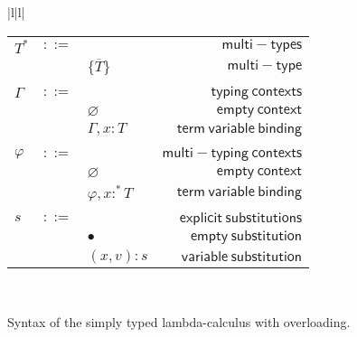 \documentclass[preprint,authoryear,sort&compress,9pt,nocopyrightspace]{article}
\newcommand{\mtP}[1]{#1^{*}}
\newcommand{\mtC}[1]{\{\overline {#1}\}}
\newcommand{\emt}{\varphi}
\newcommand{\conc}{:^{*}}
\begin{document}
\begin{figure}
\begin{small}
\begin{center}
\begin{tabular}{|l|l|}
\begin{tabular}{l c l r}
$\mtP{T}$&$::=$&&$\mathsf {multi-types}$\\
&&$\mtC{T}$&$\mathsf {multi-type}$\\
&&&\\
$\Gamma$&$::=$&&$\mathsf {typing \ contexts}$\\
&&$\varnothing$&$\mathsf {empty \ context}$\\
&&$\Gamma , x:T$&$\mathsf {term \ variable \ binding}$\\
&&&\\
$\emt$&$::=$&&$\mathsf {multi-typing \ contexts}$\\
&&$\varnothing$&$\mathsf {empty \ context}$\\
&&$\emt,x \conc T$&$\mathsf {term \ variable \ binding}$\\
&&&\\
$s$&$::=$&&$\mathsf {explicit \ substitutions}$\\
&&$ \bullet$&$\mathsf {empty \ substitution}$\\
&&$(x,v):s$&$\mathsf {variable \ substitution}$\\
\end{tabular}\\
\hline
\end{tabular}
\caption{Syntax of the simply typed lambda-calculus with overloading.}
\label{figure:sencilla}
\end{center}
\end{small}
\end{figure}
\end{document}
